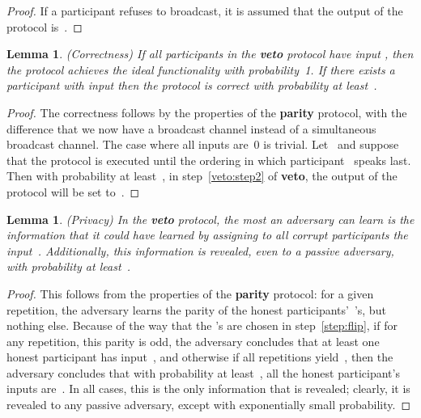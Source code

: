 \documentclass[11pt]{article}
\newtheorem{lemma}[theorem]{Lemma}
\begin{document}
\begin{proof}
If a participant refuses to broadcast, it is assumed that the output
of the protocol is~.
\end{proof}

\begin{lemma} \label{lemma:veto1}(Correctness)
If all participants in the \textbf{veto} protocol have input
, then the protocol achieves the ideal functionality with
probability~1. If there exists a participant with input  then
the protocol is correct with probability at least~.
\end{lemma}

\begin{proof}
The correctness follows by the properties of the \textbf{parity}
protocol, with the difference that we now have a broadcast channel
instead of a simultaneous broadcast channel. The case where all
inputs are~0 is trivial. Let~ and suppose that the protocol
is executed until the ordering in which participant~ speaks last.
Then with probability at least~, in step~\ref{veto:step2}
of \textbf{veto}, the output of the  protocol will be set to~.
\end{proof}

\begin{lemma}\label{veto_HC}
\label{lem:veto4} (Privacy) In the \textbf{veto} protocol, the most
 an adversary can learn is the information
that it could have learned by assigning to all corrupt participants
the input~. Additionally, this information is revealed, even to a
passive adversary,
 with
probability at least~.
\end{lemma}

\begin{proof}
This follows from the properties of the \textbf{parity} protocol:
for a given repetition, the adversary learns the parity of the
honest participants'~'s, but nothing else.
 Because of the way that the 's are chosen in
step~\ref{step:flip}, if for any repetition, this parity is odd, the
adversary concludes that at least one honest participant has
input~,  and otherwise if all repetitions yield~, then the
adversary concludes that with probability at least~, all
the honest participant's inputs are~.  In all cases, this is the
only information that is revealed; clearly, it is revealed to any passive adversary, except with exponentially small probability.
\end{proof}
\end{document}
